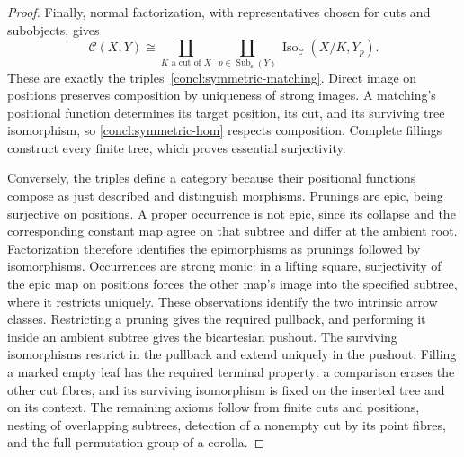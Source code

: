\documentclass[10pt,a4paper]{amsart}
\newcommand{\C}{\mathcal C}
\begin{document}
\begin{proof}
Finally, normal factorization, with representatives chosen for cuts
and subobjects, gives
\begin{equation}\label{concl:symmetric-hom}
 \C(X,Y)\cong
 \coprod_{K\text{ a cut of }X}\ \coprod_{p\in
 \operatorname{Sub}_{\mathrm{s}}(Y)}
 \operatorname{Iso}_{\C}(X/K,Y_p).
\end{equation}
These are exactly the triples~\eqref{concl:symmetric-matching}.
Direct image on positions preserves composition by uniqueness of
strong images. A matching's positional function determines its
target position, its cut, and its surviving tree isomorphism, so
\eqref{concl:symmetric-hom} respects composition. Complete fillings
construct every finite tree, which proves essential surjectivity.

Conversely, the triples define a category because their positional
functions compose as just described and distinguish morphisms.
Prunings are epic, being surjective on positions. A proper
occurrence is not epic, since its collapse and the corresponding
constant map agree on that subtree and differ at the ambient root.
Factorization therefore identifies the epimorphisms as prunings
followed by isomorphisms. Occurrences are strong monic: in a lifting
square, surjectivity of the epic map on positions forces the other
map's image into the specified subtree, where it restricts uniquely.
These observations identify the two intrinsic arrow classes.
Restricting a pruning gives the required
pullback, and performing it inside an ambient subtree gives the
bicartesian pushout. The surviving isomorphisms restrict in the
pullback and extend uniquely in the pushout. Filling a marked empty
leaf has the required terminal property: a comparison erases the
other cut fibres, and its surviving isomorphism is fixed on the
inserted tree and on its context. The remaining axioms follow from
finite cuts and positions, nesting of overlapping subtrees, detection
of a nonempty cut by its point fibres, and the full permutation group
of a corolla.
\end{proof}
\end{document}
